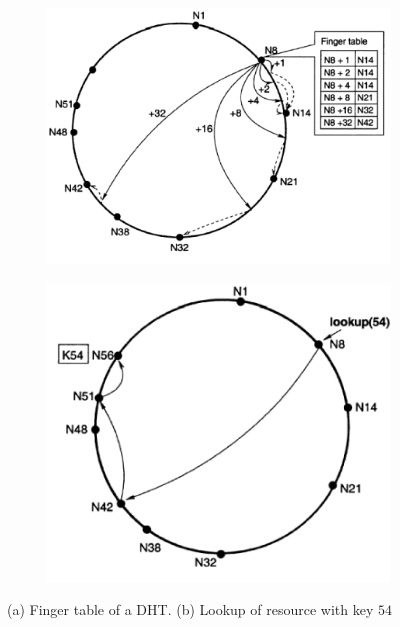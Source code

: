 \begin{figure}[h!]
        \centering
        \begin{subfigure}{.5\textwidth}
          \centering
          \includegraphics[width=\linewidth]{assets/images/dht1.png}
          \caption{}
          \label{fig:sub1}
        \end{subfigure}%
        \begin{subfigure}{.5\textwidth}
          \centering
          \includegraphics[width=\linewidth]{assets/images/dht2.png}
          \caption{}
          \label{fig:sub2}
        \end{subfigure}
        \caption{(a) Finger table of a DHT. (b) Lookup of resource with key $54$ }
        \label{fig:dht}
    \end{figure}


